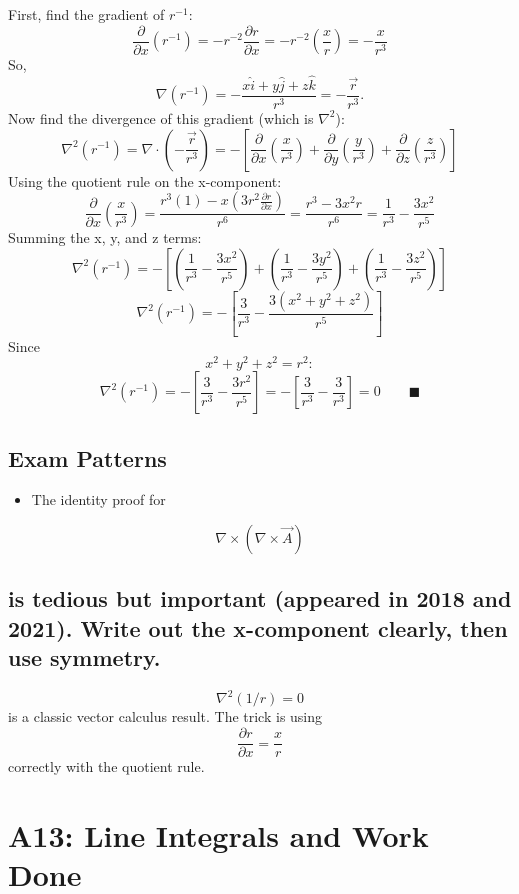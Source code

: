 \documentclass[
]{article}
\providecommand{\tightlist}{%
  \setlength{\itemsep}{0pt}\setlength{\parskip}{0pt}}
\begin{document}
First, find the gradient of \(r^{-1}\):
\[
\frac{\partial}{\partial x}(r^{-1}) = -r^{-2}\frac{\partial r}{\partial x} = -r^{-2}\left(\frac{x}{r}\right) = -\frac{x}{r^3}
\]
So,
\[
\nabla(r^{-1}) = -\frac{x\hat{i} + y\hat{j} + z\hat{k}}{r^3} = -\frac{\vec{r}}{r^3}.
\]
Now find the divergence of this gradient (which is \(\nabla^2\)):
\[
\nabla^2(r^{-1}) = \nabla \cdot \left(-\frac{\vec{r}}{r^3}\right) = -\left[ \frac{\partial}{\partial x}\left(\frac{x}{r^3}\right) + \frac{\partial}{\partial y}\left(\frac{y}{r^3}\right) + \frac{\partial}{\partial z}\left(\frac{z}{r^3}\right) \right]
\]
Using the quotient rule on the x-component:
\[
\frac{\partial}{\partial x}\left(\frac{x}{r^3}\right) = \frac{r^3(1) - x(3r^2\frac{\partial r}{\partial x})}{r^6} = \frac{r^3 - 3x^2r}{r^6} = \frac{1}{r^3} - \frac{3x^2}{r^5}
\]
Summing the x, y, and z terms:
\[
\nabla^2(r^{-1}) = -\left[ \left(\frac{1}{r^3} - \frac{3x^2}{r^5}\right) + \left(\frac{1}{r^3} - \frac{3y^2}{r^5}\right) + \left(\frac{1}{r^3} - \frac{3z^2}{r^5}\right) \right]
\]
\[
\nabla^2(r^{-1}) = -\left[ \frac{3}{r^3} - \frac{3(x^2 + y^2 + z^2)}{r^5} \right]
\]
Since
\[
x^2 + y^2 + z^2 = r^2:
\]
\[
\nabla^2(r^{-1}) = -\left[ \frac{3}{r^3} - \frac{3r^2}{r^5} \right] = -\left[ \frac{3}{r^3} - \frac{3}{r^3} \right] = 0 \qquad \blacksquare
\]

\subsection{Exam Patterns}\label{exam-patterns-10}

\begin{itemize}
\tightlist
\item
  The identity proof for
\end{itemize}
\[
\nabla \times (\nabla \times \vec{A})
\]
\subsection{is tedious but important (appeared in 2018 and 2021). Write
out the x-component clearly, then use
symmetry.}\label{is-tedious-but-important-appeared-in-2018-and-2021.-write-out-the-x-component-clearly-then-use-symmetry.}
\[
\nabla^2(1/r) = 0
\]
is a classic vector calculus result. The trick is using
\[
\frac{\partial r}{\partial x} = \frac{x}{r}
\]
correctly with the quotient rule.

\section{A13: Line Integrals and Work
Done}\label{a13-line-integrals-and-work-done}
\end{document}
